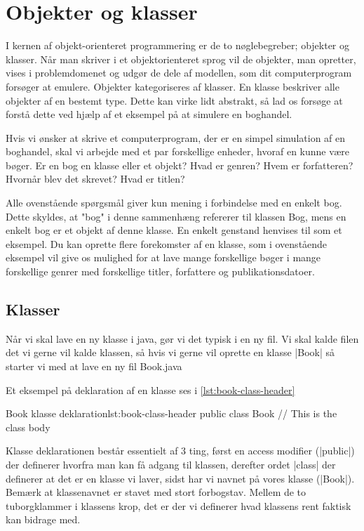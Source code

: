 \chapter{Objekter og klasser}

I kernen af objekt-orienteret programmering er de to nøglebegreber; objekter og klasser. Når man skriver i et objektorienteret sprog vil de objekter, man opretter, vises i problemdomenet og udgør de dele af modellen, som dit computerprogram forsøger at emulere. Objekter kategoriseres af klasser. En klasse beskriver alle objekter af en bestemt type. Dette kan virke lidt abstrakt, så lad os forsøge at forstå dette ved hjælp af et eksempel på at simulere en boghandel.

\begin{example}
	Hvis vi ønsker at skrive et computerprogram, der er en simpel simulation af en boghandel, skal vi arbejde med et par forskellige enheder, hvoraf en kunne være bøger. Er en bog en klasse eller et objekt? Hvad er genren? Hvem er forfatteren? Hvornår blev det skrevet? Hvad er titlen?
	
	Alle ovenstående spørgsmål giver kun mening i forbindelse med en enkelt bog. Dette skyldes, at "bog" i denne sammenhæng refererer til klassen Bog, mens en enkelt bog er et objekt af denne klasse. En enkelt genstand henvises til som et eksempel. Du kan oprette flere forekomster af en klasse, som i ovenstående eksempel vil give os mulighed for at lave mange forskellige bøger i mange forskellige genrer med forskellige titler, forfattere og publikationsdatoer.
\end{example}

\section{Klasser}
Når vi skal lave en ny klasse i java, gør vi det typisk i en ny fil. Vi skal kalde filen det vi gerne vil kalde klassen, så hvis vi gerne vil oprette en klasse \JavaInline|Book| så starter vi med at lave en ny fil Book.java

Et eksempel på deklaration af en klasse ses i \autoref{lst:book-class-header}

\begin{JavaCode}{Book klasse deklaration}{lst:book-class-header}
	public class Book {
		// This is the class body
	}
\end{JavaCode}

Klasse deklarationen består essentielt af 3 ting, først en access modifier (\JavaInline|public|) der definerer hvorfra man kan få adgang til klassen, derefter ordet \JavaInline|class| der definerer at det er en klasse vi laver, sidst har vi navnet på vores klasse (\JavaInline|Book|). Bemærk at klassenavnet er stavet med stort forbogstav. Mellem de to tuborgklammer i klassens krop, det er der vi definerer hvad klassens rent faktisk kan bidrage med.

